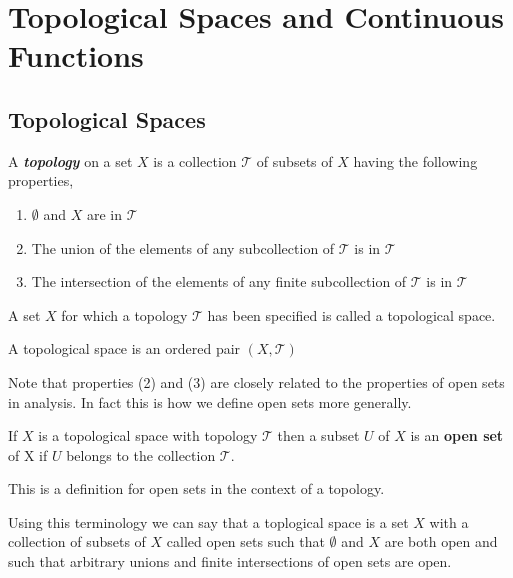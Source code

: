 \chapter{Topological Spaces and Continuous Functions}

\section{Topological Spaces}


\begin{definition}
    A \emph{\textbf{topology}} on a set $X$ is a collection $\mathcal{T}$ of subsets of $X$ having the following properties, 
    \begin{enumerate}[label=(\arabic*)]
        \item $\emptyset$ and $X$ are in $\mathcal{T}$ 
      \item  The union of the elements of any subcollection of $\mathcal{T}$ is in $\mathcal{T}$
      \item The intersection of the elements of any finite subcollection of $\mathcal{T}$ is in $\mathcal{T}$
    \end{enumerate}

    A set $X$ for which a topology $\mathcal{T}$ has been specified is called a topological space.
\end{definition}
\begin{note}
    A topological space is an ordered pair $(X, \mathcal{T})$
\end{note}
\begin{remark}
    Note that properties (2) and (3) are closely related to the properties of open sets in analysis. In fact this is how we define open sets more generally.
\end{remark}
\begin{definition}
If $X$ is a topological space with topology $\mathcal{T}$ then a subset $U$ of $X$ is an \textbf{open set} of X if $U$ belongs to the collection $\mathcal{T}$.
\end{definition}
\begin{remark}
    This is a definition for open sets in the context of a topology.
\end{remark}
\begin{note}
    Using this terminology we can say that a toplogical space is a set $X$ with a collection of subsets of $X$ called open sets such that $\emptyset$ and $X$ are both open and such that arbitrary unions and finite intersections of open sets are open.
\end{note} 


